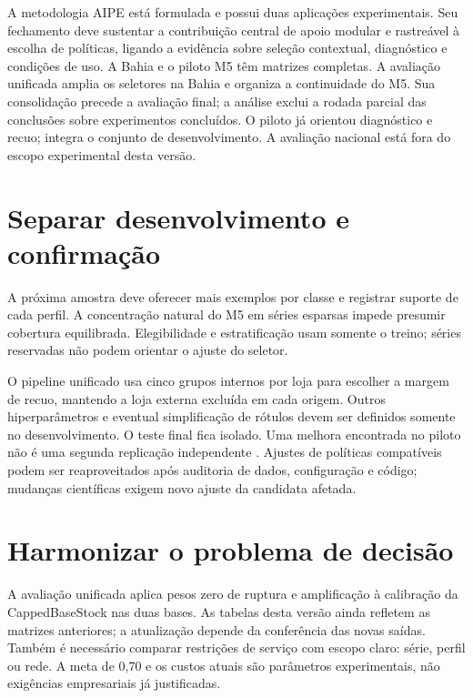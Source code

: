 
A metodologia AIPE está formulada e possui duas aplicações experimentais. Seu fechamento deve sustentar a contribuição central de apoio modular e rastreável à escolha de políticas, ligando a evidência sobre seleção contextual, diagnóstico e condições de uso. A Bahia e o piloto M5 têm matrizes completas. A avaliação unificada amplia os seletores na Bahia e organiza a continuidade do M5. Sua consolidação precede a avaliação final; a análise exclui a rodada parcial das conclusões sobre experimentos concluídos. O piloto já orientou diagnóstico e recuo; integra o conjunto de desenvolvimento. A avaliação nacional está fora do escopo experimental desta versão.

\section{Separar desenvolvimento e confirmação}
\label{sec:estudos_caso_adicionais}
A próxima amostra deve oferecer mais exemplos por classe e registrar suporte de cada perfil. A concentração natural do M5 em séries esparsas impede presumir cobertura equilibrada. Elegibilidade e estratificação usam somente o treino; séries reservadas não podem orientar o ajuste do seletor.

O pipeline unificado usa cinco grupos internos por loja para escolher a margem de recuo, mantendo a loja externa excluída em cada origem. Outros hiperparâmetros e eventual simplificação de rótulos devem ser definidos somente no desenvolvimento. O teste final fica isolado. Uma melhora encontrada no piloto não é uma segunda replicação independente \citep{CawleyTalbot2010}. Ajustes de políticas compatíveis podem ser reaproveitados após auditoria de dados, configuração e código; mudanças científicas exigem novo ajuste da candidata afetada.

\section{Harmonizar o problema de decisão}
A avaliação unificada aplica pesos zero de ruptura e amplificação à calibração da CappedBaseStock nas duas bases. As tabelas desta versão ainda refletem as matrizes anteriores; a atualização depende da conferência das novas saídas. Também é necessário comparar restrições de serviço com escopo claro: série, perfil ou rede. A meta de 0,70 e os custos atuais são parâmetros experimentais, não exigências empresariais já justificadas.

